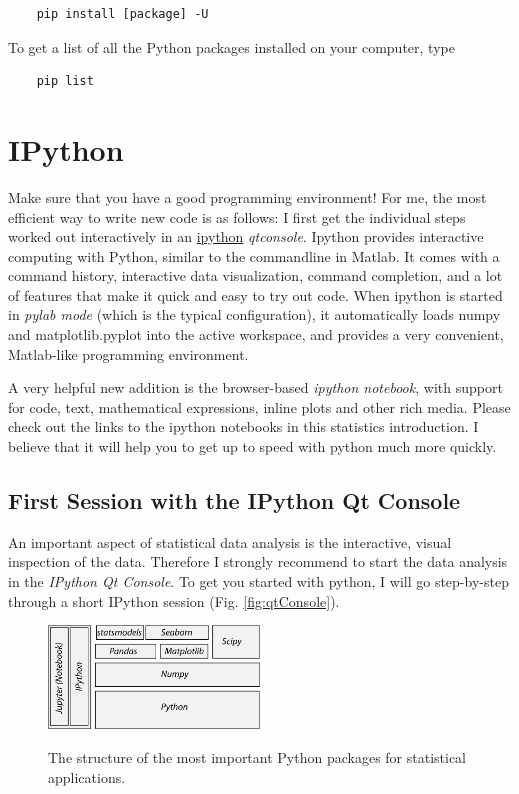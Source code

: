 \begin{lstlisting}
    pip install [package] -U
\end{lstlisting}

To get a list of all the Python packages installed on your computer, type

\begin{lstlisting}
    pip list
\end{lstlisting}


\section{IPython}

Make sure that you have a good programming environment! For me, the most efficient way to write new code is as follows: I first get the individual steps worked out interactively in an \href{http://ipython.org/}{ipython} \emph{qtconsole}. Ipython  provides interactive computing with Python, similar to the commandline in Matlab. It comes with a command history, interactive data visualization, command completion, and a lot of features that make it quick and easy to try out code. When ipython is started in \emph{pylab mode} (which is the typical configuration), it automatically loads numpy and matplotlib.pyplot into the active workspace, and provides a very convenient, Matlab-like programming environment.

A very helpful new addition is the browser-based \emph{ipython notebook}, with support for code, text, mathematical expressions, inline plots and other rich media. Please check out the links to the ipython
notebooks in this statistics introduction. I believe that it will  help you to get up to speed with python much more quickly.

\subsection{First Session with the IPython Qt Console}

An important aspect of statistical data analysis is the interactive, visual inspection of the data. Therefore I strongly recommend to start the data analysis in the \emph{IPython Qt Console}. To get you started with python, I will go step-by-step through a short IPython session (Fig. \ref{fig:qtConsole}).


\begin{figure}[h]
  \centering
  \includegraphics[width=0.5\textwidth]{../Images/ScientificPython.jpg}\\
  \caption{The structure of the most important Python packages for statistical applications.}
  \label{fig:scientificPython}
\end{figure}

